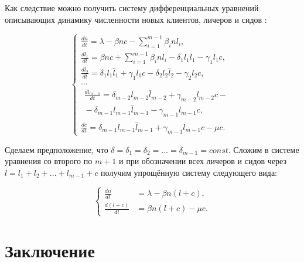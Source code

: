 \documentclass[floatfix,
showkeys,
twocolumn, nofootinbib, superscriptaddress, ]{revtex4-1}
\begin{document}
Как следствие можно получить систему дифференциальных уравнений
описывающих динамику численности новых клиентов, личеров и сидов :



\begin{equation} \label{bt:11}
\left \{
\begin{gathered}
  \frac{d n}{d t} =      \lambda - \beta n c - \sum_{i=1}^{m-1} \beta_i n l_i, \\
 \frac{d l_1}{d t}=     \beta n c + \sum_{i=1}^{m-1} \beta_i n l_i -\delta_1 l_1 \bar{l}_1 - \gamma_1 l_1 c, \\ 
 \frac{d l_2}{d t}=  \delta_1 l_1 \bar{l}_1 + \gamma_1 l_1 c -  \delta_2 l_2 \bar{l}_2 - \gamma_2 l_2 c,  \\
    \ldots \\
\begin{multlined}
 \frac{d l_{m-1}}{d t}=  \delta_{m-2} l_{m-2} \bar{l}_{m-2} + 
 \gamma_{m-2} l_{m-2} c - {} \\ {} - 
 \delta_{m-1} l_{m-1} \bar{l}_{m-1} -
 \gamma_{m-1} l_{m-1} c,
\end{multlined}
\\ 
\frac{d c}{d t}= \delta_{m-1} l_{m-1} \bar{l}_{m-1} + \gamma_{m-1} l_{m-1} c  - \mu c. 
\end{gathered}
\right.
\end{equation}

Сделаем предположение, что
$\delta=\delta_{1}=\delta_{2}=...=\delta_{m-1}=const$. Сложим в
системе уравнения со второго по $m+1$ и при обозначении всех личеров и
сидов через $l = l_1 + l_2 + ... + l_{m-1} + c$ получим упрощённую
систему следующего вида:


\begin{equation} 
\label{bt:12}
\left \{
\begin{aligned}
 \frac{d n}{d t}&=      \lambda - \beta n (l+c), \\
 \frac{d (l+c)}{d t}&=     \beta n (l+c)  - \mu c. 
\end{aligned}
\right.
\end{equation}

\section{Заключение}
\end{document}
